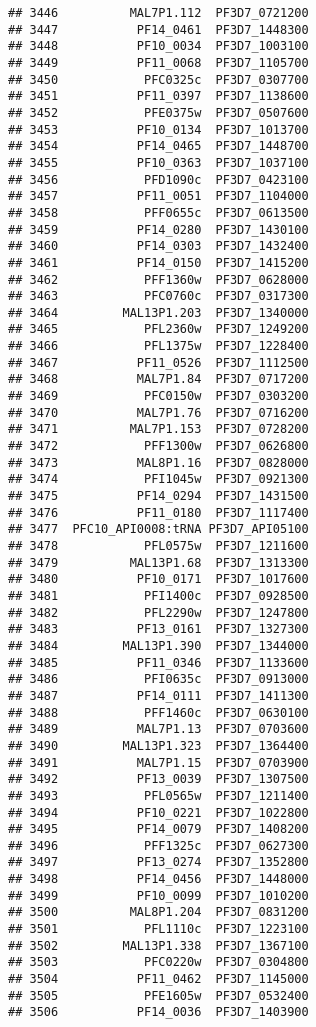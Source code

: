 \documentclass[12pt, a4paper]{article}\usepackage[]{graphicx}\usepackage[]{color}
\makeatletter
\newenvironment{kframe}{%
 \def\at@end@of@kframe{}%
 \ifinner\ifhmode%
  \def\at@end@of@kframe{\end{minipage}}%
  \begin{minipage}{\columnwidth}%
 \fi\fi%
 \def\FrameCommand##1{\hskip\@totalleftmargin \hskip-\fboxsep
 \colorbox{shadecolor}{##1}\hskip-\fboxsep
     \hskip-\linewidth \hskip-\@totalleftmargin \hskip\columnwidth}%
 \MakeFramed {\advance\hsize-\width
   \@totalleftmargin\z@ \linewidth\hsize
   \@setminipage}}%
 {\par\unskip\endMakeFramed%
 \at@end@of@kframe}
\newenvironment{knitrout}{}{} %
\makeatother
\begin{document}
\begin{knitrout}
\begin{kframe}
\begin{verbatim}
## 3446          MAL7P1.112  PF3D7_0721200
## 3447           PF14_0461  PF3D7_1448300
## 3448           PF10_0034  PF3D7_1003100
## 3449           PF11_0068  PF3D7_1105700
## 3450            PFC0325c  PF3D7_0307700
## 3451           PF11_0397  PF3D7_1138600
## 3452            PFE0375w  PF3D7_0507600
## 3453           PF10_0134  PF3D7_1013700
## 3454           PF14_0465  PF3D7_1448700
## 3455           PF10_0363  PF3D7_1037100
## 3456            PFD1090c  PF3D7_0423100
## 3457           PF11_0051  PF3D7_1104000
## 3458            PFF0655c  PF3D7_0613500
## 3459           PF14_0280  PF3D7_1430100
## 3460           PF14_0303  PF3D7_1432400
## 3461           PF14_0150  PF3D7_1415200
## 3462            PFF1360w  PF3D7_0628000
## 3463            PFC0760c  PF3D7_0317300
## 3464         MAL13P1.203  PF3D7_1340000
## 3465            PFL2360w  PF3D7_1249200
## 3466            PFL1375w  PF3D7_1228400
## 3467           PF11_0526  PF3D7_1112500
## 3468           MAL7P1.84  PF3D7_0717200
## 3469            PFC0150w  PF3D7_0303200
## 3470           MAL7P1.76  PF3D7_0716200
## 3471          MAL7P1.153  PF3D7_0728200
## 3472            PFF1300w  PF3D7_0626800
## 3473           MAL8P1.16  PF3D7_0828000
## 3474            PFI1045w  PF3D7_0921300
## 3475           PF14_0294  PF3D7_1431500
## 3476           PF11_0180  PF3D7_1117400
## 3477  PFC10_API0008:tRNA PF3D7_API05100
## 3478            PFL0575w  PF3D7_1211600
## 3479          MAL13P1.68  PF3D7_1313300
## 3480           PF10_0171  PF3D7_1017600
## 3481            PFI1400c  PF3D7_0928500
## 3482            PFL2290w  PF3D7_1247800
## 3483           PF13_0161  PF3D7_1327300
## 3484         MAL13P1.390  PF3D7_1344000
## 3485           PF11_0346  PF3D7_1133600
## 3486            PFI0635c  PF3D7_0913000
## 3487           PF14_0111  PF3D7_1411300
## 3488            PFF1460c  PF3D7_0630100
## 3489           MAL7P1.13  PF3D7_0703600
## 3490         MAL13P1.323  PF3D7_1364400
## 3491           MAL7P1.15  PF3D7_0703900
## 3492           PF13_0039  PF3D7_1307500
## 3493            PFL0565w  PF3D7_1211400
## 3494           PF10_0221  PF3D7_1022800
## 3495           PF14_0079  PF3D7_1408200
## 3496            PFF1325c  PF3D7_0627300
## 3497           PF13_0274  PF3D7_1352800
## 3498           PF14_0456  PF3D7_1448000
## 3499           PF10_0099  PF3D7_1010200
## 3500          MAL8P1.204  PF3D7_0831200
## 3501            PFL1110c  PF3D7_1223100
## 3502         MAL13P1.338  PF3D7_1367100
## 3503            PFC0220w  PF3D7_0304800
## 3504           PF11_0462  PF3D7_1145000
## 3505            PFE1605w  PF3D7_0532400
## 3506           PF14_0036  PF3D7_1403900

\end{verbatim}
\end{kframe}
\end{knitrout}
\end{document}

